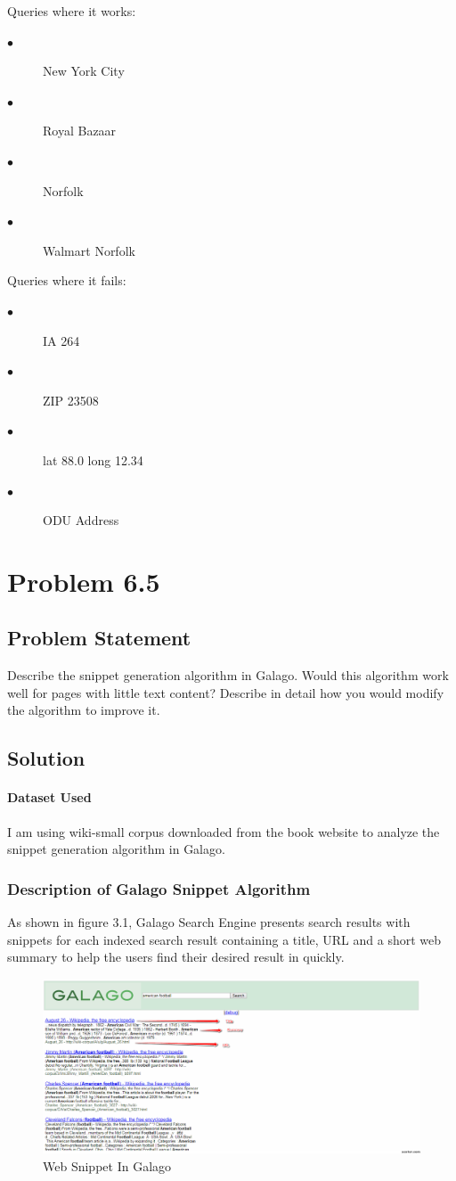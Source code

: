 \documentclass[12pt]{report}
\begin{document}

Queries where it works:
\begin{description}
\item[$\bullet$]New York City
\item[$\bullet$]Royal Bazaar
\item[$\bullet$]Norfolk
\item[$\bullet$]Walmart Norfolk
\end{description}
Queries where it fails:
\begin{description}
\item[$\bullet$]IA 264
\item[$\bullet$]ZIP 23508
\item[$\bullet$]lat 88.0 long 12.34
\item[$\bullet$]ODU Address
\end{description}

\chapter{Problem 6.5}
\section{Problem Statement}
Describe the snippet generation algorithm in Galago. Would this algorithm work well for pages with little text content? Describe in detail how you would modify the algorithm to improve it.
\section{Solution}
\subsubsection{Dataset Used}
I am using wiki-small corpus downloaded from the book website to analyze the snippet generation algorithm in Galago.
\subsection{Description of Galago Snippet Algorithm} 
As shown in figure 3.1, Galago Search Engine presents search results with snippets for each indexed search result containing a title, URL and a short web summary to help the users find their desired result in quickly.
\begin{figure}[ht]
  \centering
  \includegraphics[width=1\textwidth]{Problem6_5/WebSnippet.PNG}
  \caption{Web Snippet In Galago}
  \label{fig:1}
\end{figure}
\end{document}
